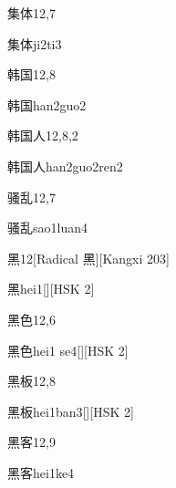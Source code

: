 \begin{entry}{集体}{12,7}
  \begin{phonetics}{集体}{ji2ti3}
  \end{phonetics}
\end{entry}

\begin{entry}{韩国}{12,8}
  \begin{phonetics}{韩国}{han2guo2}
  \end{phonetics}
\end{entry}

\begin{entry}{韩国人}{12,8,2}
  \begin{phonetics}{韩国人}{han2guo2ren2}
  \end{phonetics}
\end{entry}

\begin{entry}{骚乱}{12,7}
  \begin{phonetics}{骚乱}{sao1luan4}
  \end{phonetics}
\end{entry}

\begin{entry}{黑}{12}[Radical ⿊][Kangxi 203]
  \begin{phonetics}{黑}{hei1}[][HSK 2]
  \end{phonetics}
\end{entry}

\begin{entry}{黑色}{12,6}
  \begin{phonetics}{黑色}{hei1 se4}[][HSK 2]
  \end{phonetics}
\end{entry}

\begin{entry}{黑板}{12,8}
  \begin{phonetics}{黑板}{hei1ban3}[][HSK 2]
  \end{phonetics}
\end{entry}

\begin{entry}{黑客}{12,9}
  \begin{phonetics}{黑客}{hei1ke4}
  \end{phonetics}
\end{entry}


